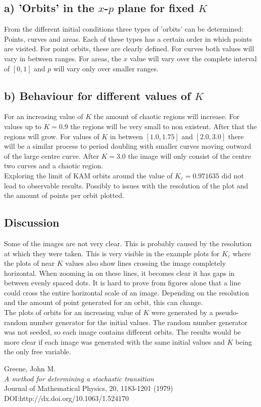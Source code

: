 \documentclass{article}
\begin{document}
\subsection{a) 'Orbits' in the $x$-$p$ plane for fixed $K$}
From the different initial conditions three types of 'orbits' can be determined: Points, curves and areas. Each of these types has a certain order in which points are visited. For point orbits, these are clearly defined. For curves both values will vary in between ranges. For areas, the $x$ value will vary over the complete interval of $[0,1]$ and $p$ will vary only over smaller ranges.

\newpage

\subsection{b) Behaviour for different values of $K$}
For an increasing value of $K$ the amount of chaotic regions will increase. For values up to $K = 0.9$ the regions will be very small to non existent. After that the regions will grow. For values of $K$ in between $[1.0,1.75]$ and $[2.0,3.0]$ there will be a similar process to period doubling with smaller curves moving outward of the large centre curve. After $K = 3.0$ the image will only consist of the centre two curves and a chaotic region.\\
Exploring the limit of KAM orbits around the value of $K_c = 0.971635$ did not lead to observable results. Possibly to issues with the resolution of the plot and the amount of points per orbit plotted.

\subsection{Discussion}
Some of the images are not very clear. This is probably caused by the resolution at which they were taken. This is very visible in the example plots for $K_c$ where the plots of near $K$ values also show lines crossing the image completely horizontal. When zooming in on these lines, it becomes clear it has gaps in between evenly spaced dots. It is hard to prove from figures alone that a line could cross the entire horizontal scale of an image. Depending on the resolution and the amount of point generated for an orbit, this can change.\\
The plots of orbits for an increasing value of $K$ were generated by a pseudo-random number generator for the initial values. The random number generator was not seeded, so each image contains different orbits. The results would be more clear if each image was generated with the same initial values and $K$ being the only free variable.

\begin{thebibliography}{1337}
Greene, John M.\\
\emph{A method for determining a stochastic transition}\\
Journal of Mathematical Physics, 20, 1183-1201 (1979)\\ DOI:http://dx.doi.org/10.1063/1.524170

\end{thebibliography}
\end{document}
